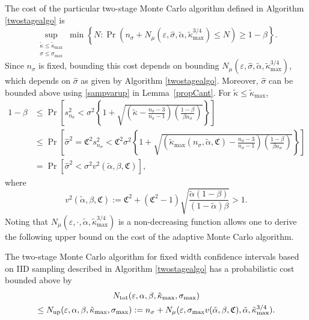 \documentclass[graybox]{svmult}
\newcommand{\fudge}{\mathfrak{C}}
\newcommand{\Prob}{\Pr}
\newcommand{\hsigma}{\hat{\sigma}}
\newcommand{\talpha}{\tilde{\alpha}}
\newcommand{\tkappa}{\tilde{\kappa}}
\begin{document}
The cost of the particular two-stage Monte Carlo algorithm defined in Algorithm \ref{twostagealgo} is
\begin{equation*}
\sup_{\substack{\tkappa \le \tkappa_{\max} \\ \sigma \le \sigma_{\max}}} \min\left\{N : \Prob(n_{\sigma} + N_{\mu}(\varepsilon,\hsigma,\tilde\alpha,\tilde\kappa_{\max}^{3/4}) \le N) \ge 1-\beta  \right \}.
\end{equation*}
Since $n_{\sigma}$ is fixed, bounding this cost depends on bounding $N_{\mu}(\varepsilon,\hsigma,\tilde\alpha,\tilde\kappa_{\max}^{3/4})$, which depends on $\hsigma$ as given by Algorithm \ref{twostagealgo}.  Moreover, $\hsigma$ can be bounded above using \eqref{sampvarup} in Lemma~\ref{propCant}.  For $\tkappa \le \tkappa_{\max}$, 
\begin{align*}
1-\beta & \le \Prob\left[s^2_{n_{\sigma}} < \sigma^2 \left\{1 + \sqrt{\left ( \tkappa  - \frac{n_{\sigma}-3}{n_{\sigma}-1}\right)\left(\frac{1-\beta}{\beta n_{\sigma}}\right)}\right\} \right] \\
& \le \Prob\left[\hsigma^2 = \fudge^2 s^2_{n_{\sigma}} < \fudge^2\sigma^2 \left\{1 + \sqrt{\left ( \tkappa_{\max}(n_{\sigma},\talpha,\fudge)  - \frac{n_{\sigma}-3}{n_{\sigma}-1}\right)\left(\frac{1-\beta}{\beta n_{\sigma}}\right)}\right\} \right] \\
& = \Prob\left[\hsigma^2 < \sigma^2 v^2(\talpha,\beta,\fudge) \right],
\end{align*}
where
\[
v^2(\talpha,\beta,\fudge) :=  \fudge^2 + \left(\fudge^2 - 1\right)\sqrt{\frac{ \talpha(1-\beta)}{(1-\talpha)\beta} } > 1.
\]
Noting that $N_{\mu}(\varepsilon,\cdot,\tilde\alpha,\tilde\kappa_{\max}^{3/4})$ is a non-decreasing function allows one to derive the following upper bound on the cost of the adaptive Monte Carlo algorithm.

\begin{theorem} \label{costtheorem} The two-stage Monte Carlo algorithm for fixed width confidence intervals based on IID sampling described in Algorithm \ref{twostagealgo} has a probabilistic cost bounded above by 
\begin{multline*}
N_{\rm{tot}}(\varepsilon,\alpha, \beta, \tkappa_{\max}, \sigma_{\max}) \\
\le
N_{\rm{up}}(\varepsilon,\alpha, \beta, \tkappa_{\max}, \sigma_{\max}) :=  n_{\sigma} + N_{\mu}(\varepsilon,\sigma_{\max}v(\talpha,\beta,\fudge),\talpha,\tkappa_{\max}^{3/4}) .
\end{multline*} 
\end{theorem}
\end{document}
